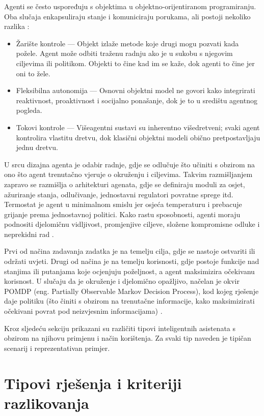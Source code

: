 \documentclass[]{foi}
\begin{document}
Agenti se često uspoređuju s objektima u objektno-orijentiranom programiranju. Oba slučaja enkapsuliraju stanje i komuniciraju porukama, ali postoji nekoliko razlika \cite[str. 47 i 48]{wooldridge2009multiagent}:
\begin{itemize}
\item Žarište kontrole — Objekt izlaže metode koje drugi mogu pozvati kada požele. Agent može odbiti traženu radnju ako je u sukobu s njegovim ciljevima ili politikom. Objekti to čine 
kad im se kaže, dok agenti to čine jer oni to žele.
\item Fleksibilna autonomija — Osnovni objektni model ne govori kako integrirati reaktivnost, proaktivnost i socijalno ponašanje, dok je to u središtu agentnog pogleda.
\item Tokovi kontrole — Višeagentni sustavi su inherentno višedretveni; svaki agent kontrolira vlastitu dretvu, dok klasični objektni modeli obično pretpostavljaju jednu dretvu.
\end{itemize}

U srcu dizajna agenta je odabir radnje, gdje se odlučuje što učiniti s obzirom na ono što agent trenutačno vjeruje o okruženju i ciljevima. Takvim razmišljanjem zapravo se razmišlja o 
arhitekturi agenata, gdje se definiraju moduli za osjet, ažuriranje stanja, odlučivanje, jednostavni regulatori povratne sprege itd. Termostat je agent u minimalnom smislu jer osjeća 
temperaturu i prebacuje grijanje prema jednostavnoj politici. Kako rastu sposobnosti, agenti moraju podnositi djelomičnu vidljivost, promjenjive ciljeve, složene kompromisne odluke i 
neprekidni rad \cite[str 39 i 45]{wooldridge2009multiagent}.

Prvi od načina zadavanja zadatka je na temelju cilja, gdje se nastoje ostvariti ili održati uvjeti. Drugi od načina je na temelju korisnosti, gdje postoje funkcije nad stanjima ili 
putanjama koje ocjenjuju poželjnost, a agent maksimizira očekivanu korisnost. U slučaju da je okruženje i djelomično opažljivo, načelan je okvir POMDP (eng. Partially Observable Markov 
Decision Process), kod kojeg rješenje daje politiku (što činiti s obzirom na trenutačne informacije, kako maksimizirati očekivani povrat pod neizvjesnim informacijama) \cite[str. 56 i 57 i 64]{wooldridge2009multiagent}. 

Kroz sljedeću sekciju prikazani su različiti tipovi inteligentnih asistenata s obzirom na njihovu primjenu i način korištenja. Za svaki tip naveden je tipičan scenarij i reprezentativan primjer.

\section{Tipovi rješenja i kriteriji razlikovanja}  
\end{document}

